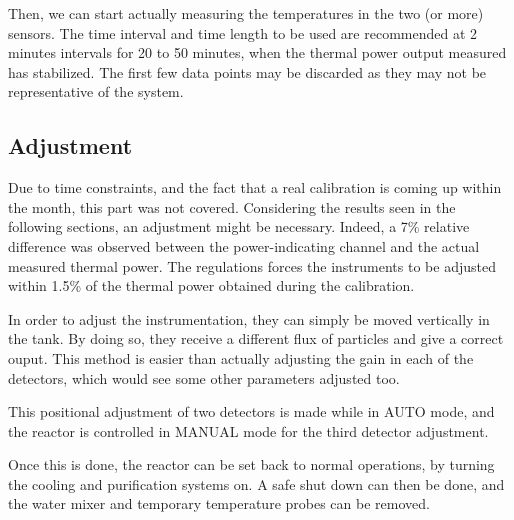 Then, we can start actually measuring the temperatures in the two (or more) sensors. The time interval and time length to be used are recommended at 2 minutes intervals for 20 to 50 minutes, when the thermal power output measured has stabilized. The first few data points may be discarded as they may not be representative of the system.


\subsection{Adjustment}

Due to time constraints, and the fact that a real calibration is coming up within the month, this part was not covered. Considering the results seen in the following sections, an adjustment might be necessary. Indeed, a 7\% relative difference was observed between the power-indicating channel and the actual measured thermal power. The regulations forces the instruments to be adjusted within 1.5\% of the thermal power obtained during the calibration.

In order to adjust the instrumentation, they can simply be moved vertically in the tank. By doing so, they receive a different flux of particles and give a correct ouput. This method is easier than actually adjusting the gain in each of the detectors, which would see some other parameters adjusted too.

This positional adjustment of two detectors is made while in AUTO mode, and the reactor is controlled in MANUAL mode for the third detector adjustment.

Once this is done, the reactor can be set back to normal operations, by turning the cooling and purification systems on. A safe shut down can then be done, and the water mixer and temporary temperature probes can be removed.
